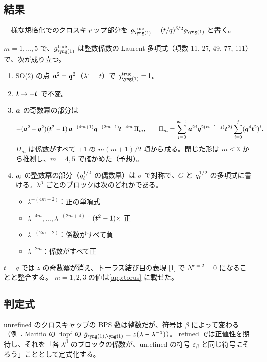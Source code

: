 \subsection{結果}
一様な規格化でのクロスキャップ部分を $g^{\mathrm{true}}_{\yone} = (t/q)^{\delta/2} g_{\yone}$ と書く。
\begin{compresult}\label{cr:torus}
$m = 1, \dots, 5$ で、$g^{\mathrm{true}}_{\yone}$ は整数係数の Laurent 多項式（項数 11, 27, 49, 77, 111）で、次が成り立つ。
\begin{enumerate}
\item[(N)] SO(2) の点 $\bm{a}^2 = \bm{q}^2$（$\lambda^2 = t$）で $g^{\mathrm{true}}_{\yone} = 1$。
\item[(P)] $\bm{t} \to -\bm{t}$ で不変。
\item[($c{=}2$)] $\bm{a}$ の奇数冪の部分は
\[
-(\bm{a}^2 - \bm{q}^2)(\bm{t}^2 - 1)\,\bm{a}^{-(4m+1)}\bm{q}^{-(2m-1)}\bm{t}^{-4m}\,\Pi_m,\qquad
\Pi_m = \sum_{j=0}^{m-1}\bm{a}^{2j}\bm{q}^{2(m-1-j)}\bm{t}^{2j}\sum_{i=0}^{j}(\bm{q}^4\bm{t}^2)^i .
\]
$\Pi_m$ は係数がすべて $+1$ の $m(m+1)/2$ 項から成る。閉じた形は $m \le 3$ から推測し、$m = 4, 5$ で確かめた（予想）。
\item[($c{=}1$)] $q_\ell$ の整数冪の部分（$q_\ell^{1/2}$ の偶数冪）は $\sigma$ で対称で、$G$ と $q_r^{1/2}$ の多項式に書ける。$\lambda^\beta$ ごとのブロックは次のどれかである。
  \begin{itemize}
  \item $\lambda^{-(4m+2)}$：正の単項式
  \item $\lambda^{-4m}, \dots, \lambda^{-(2m+4)}$：$(\bm{t}^2 - 1)\times$ 正
  \item $\lambda^{-(2m+2)}$：係数がすべて負
  \item $\lambda^{-2m}$：係数がすべて正
  \end{itemize}
\end{enumerate}
\end{compresult}
$t = q$ では $z$ の奇数冪が消え、トーラス結び目の表現 [1] で $N^{c=2} = 0$ になることと整合する。
$m = 1, 2, 3$ の値は\ref{app:torus} に載せた。

\subsection{判定式}\label{sec:criterion}
unrefined のクロスキャップの BPS 数は整数だが、符号は $\beta$ によって変わる（例：Mariño の Hopf の $\hat g_{\yone,\yone} = z(\lambda - \lambda^{-1})$）。
refined では正値性を期待し、それを「各 $\lambda^\beta$ のブロックの係数が、unrefined の符号 $\varepsilon_\beta$ と同じ符号にそろう」こととして定式化する。

